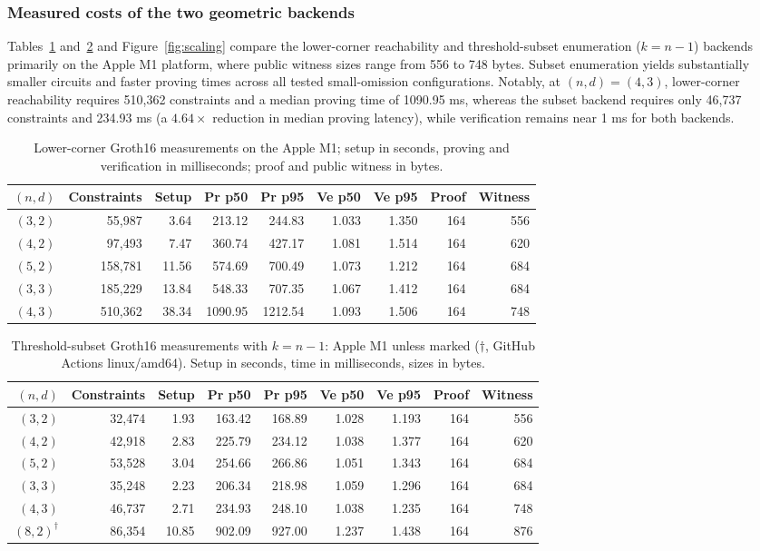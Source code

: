 \subsubsection{Measured costs of the two geometric backends}
Tables~\ref{tab:crypto} and~\ref{tab:subset} and Figure~\ref{fig:scaling} compare the lower-corner reachability and threshold-subset enumeration ($k = n - 1$) backends primarily on the Apple M1 platform, where public witness sizes range from 556 to 748 bytes. Subset enumeration yields substantially smaller circuits and faster proving times across all tested small-omission configurations. Notably, at $(n, d) = (4, 3)$, lower-corner reachability requires 510,362 constraints and a median proving time of 1090.95 ms, whereas the subset backend requires only 46,737 constraints and 234.93 ms (a $4.64\times$ reduction in median proving latency), while verification remains near 1 ms for both backends.

\begin{table}[htbp]\centering\scriptsize
\setlength{\tabcolsep}{3pt}
\caption{Lower-corner Groth16 measurements on the Apple M1; setup in seconds, proving and verification in milliseconds; proof and public witness in bytes.}\label{tab:crypto}
\begin{tabular}{rrrrrrrrr}\toprule
$(n,d)$&Constraints&Setup&Pr p50&Pr p95&Ve p50&Ve p95&Proof&Witness\\\midrule
$(3,2)$&55,987&3.64&213.12&244.83&1.033&1.350&164&556\\
$(4,2)$&97,493&7.47&360.74&427.17&1.081&1.514&164&620\\
$(5,2)$&158,781&11.56&574.69&700.49&1.073&1.212&164&684\\
$(3,3)$&185,229&13.84&548.33&707.35&1.067&1.412&164&684\\
$(4,3)$&510,362&38.34&1090.95&1212.54&1.093&1.506&164&748\\\bottomrule
\end{tabular}
\end{table}

\begin{table}[htbp]\centering\scriptsize
\setlength{\tabcolsep}{3pt}
\caption{Threshold-subset Groth16 measurements with $k=n-1$: Apple M1 unless marked ($\dagger$, GitHub Actions linux/amd64). Setup in seconds, time in milliseconds, sizes in bytes.}\label{tab:subset}
\begin{tabular}{rrrrrrrrr}\toprule
$(n,d)$&Constraints&Setup&Pr p50&Pr p95&Ve p50&Ve p95&Proof&Witness\\\midrule
$(3,2)$&32,474&1.93&163.42&168.89&1.028&1.193&164&556\\
$(4,2)$&42,918&2.83&225.79&234.12&1.038&1.377&164&620\\
$(5,2)$&53,528&3.04&254.66&266.86&1.051&1.343&164&684\\
$(3,3)$&35,248&2.23&206.34&218.98&1.059&1.296&164&684\\
$(4,3)$&46,737&2.71&234.93&248.10&1.038&1.235&164&748\\
$(8,2)^\dagger$&86,354&10.85&902.09&927.00&1.237&1.438&164&876\\\bottomrule
\end{tabular}
\end{table}

